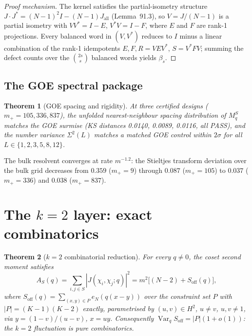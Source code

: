 \documentclass[11pt]{article}
\newtheorem{theorem}{Theorem}[section]
\begin{document}
\begin{proof}[Proof mechanism]
The kernel satisfies the partial-isometry structure
$J \cdot J^* = (N{-}1)^2 I - (N{-}1)J_{\mathrm{all}}$
(Lemma~91.3), so $V = J/(N{-}1)$ is a partial isometry with
$V V^* = I - E$, $V^* V = I - F$, where $E$ and $F$ are rank-1
projections.  Every balanced word in $(V, V^*)$ reduces to $I$ minus
a linear combination of the rank-1 idempotents $E, F, R = VEV^*$,
$S = V^*FV$; summing the defect counts over the
$\binom{2s}{s}$ balanced words yields $\beta_s$.
\end{proof}

\subsection{The GOE spectral package}

\begin{theorem}[GOE spacing and rigidity]\label{thm:goe}
At three certified designs ($m_+ = 105, 336, 837$), the unfolded
nearest-neighbour spacing distribution of $M_q^S$ matches the GOE
surmise (KS distances 0.0140, 0.0089, 0.0116, all PASS), and the
number variance $\Sigma^2(L)$ matches a matched GOE control within
$2\sigma$ for all $L \in \{1,2,3,5,8,12\}$.
\end{theorem}

The bulk resolvent converges at rate $m^{-1.2}$: the Stieltjes
transform deviation over the bulk grid decreases from $0.359$ ($m_+ =
9$) through $0.087$ ($m_+ = 105$) to $0.037$ ($m_+ = 336$) and
$0.038$ ($m_+ = 837$).

\section{The \texorpdfstring{$k=2$}{k=2} layer: exact combinatorics}
\label{sec:k2}

\begin{theorem}[$k=2$ combinatorial reduction]\label{thm:k2}
For every $q \neq 0$, the coset second moment satisfies
\[
  A_S(q) = \sum_{i,j \in S}|J(\chi_i,\chi_j;q)|^2
         = m^2\big[(N{-}2) + S_{\mathrm{off}}(q)\big],
\]
where $S_{\mathrm{off}}(q) = \sum_{(x,y) \in P} e_N(q(x{-}y))$ over
the constraint set $P$ with $|P| = (K{-}1)(K{-}2)$ exactly,
parametrised by $(u,v) \in H^2$, $u \neq v$, $u,v \neq 1$, via
$y = (1{-}v)/(u{-}v)$, $x = uy$.  Consequently
$\operatorname{Var}_q S_{\mathrm{off}} = |P|(1 + o(1))$: the $k{=}2$
fluctuation is pure combinatorics.
\end{theorem}
\end{document}
